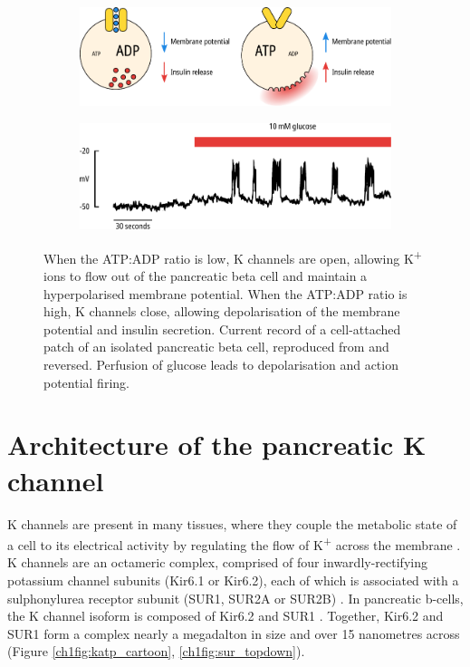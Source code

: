 \begin{figure}[h]
	\centering
	\begin{subfigure}[t]{0.9\textwidth}
		\caption{}\label{ch1fig:beta_cells}
		\centering
		\includegraphics[width=\textwidth]{beta_cells.pdf}
	\end{subfigure}
	\vfill
	\begin{subfigure}[t]{0.9\textwidth}
		\caption{}\label{ch1fig:beta_cells_firing}
		\centering
		\includegraphics[width=\textwidth]{beta_cells_firing.pdf}
	\end{subfigure}
	\caption[Electrical excitability of pancreatic beta cells]{
		 When the ATP:ADP ratio is low, K\ATP{} channels are open, allowing K\textsuperscript{+} ions to flow out of the pancreatic beta cell and maintain a hyperpolarised membrane potential.
		When the ATP:ADP ratio is high, K\ATP{} channels close, allowing depolarisation of the membrane potential and insulin secretion.
		 Current record of a cell-attached patch of an isolated pancreatic beta cell, reproduced from \cite{rorsman_calcium_1986} and reversed. 
		Perfusion of glucose leads to depolarisation and action potential firing.
	}
	\label{ch1fig:beta_cells_overview}
\end{figure}

\section{Architecture of the pancreatic K\ATP{} channel}

K\ATP{} channels are present in many tissues, where they couple the metabolic state of a cell to its electrical activity by regulating the flow of K\textsuperscript{+} across the membrane \cite{nichols_k_2006}.
K\ATP{} channels are an octameric complex, comprised of four inwardly-rectifying potassium channel subunits (Kir6.1 or Kir6.2), each of which is associated with a sulphonylurea receptor subunit (SUR1, SUR2A or SUR2B) \cite{inagaki_family_1996, yamada_sulphonylurea_1997, shyng_octameric_1997, clement_association_1997}.
In pancreatic \textgreek{b}-cells, the K\ATP{} channel isoform is composed of Kir6.2 and SUR1 \cite{inagaki_reconstitution_1995}.
Together, Kir6.2 and SUR1 form a complex nearly a megadalton in size and over 15 nanometres across (Figure \ref{ch1fig:katp_cartoon}, \ref{ch1fig:sur_topdown}).

